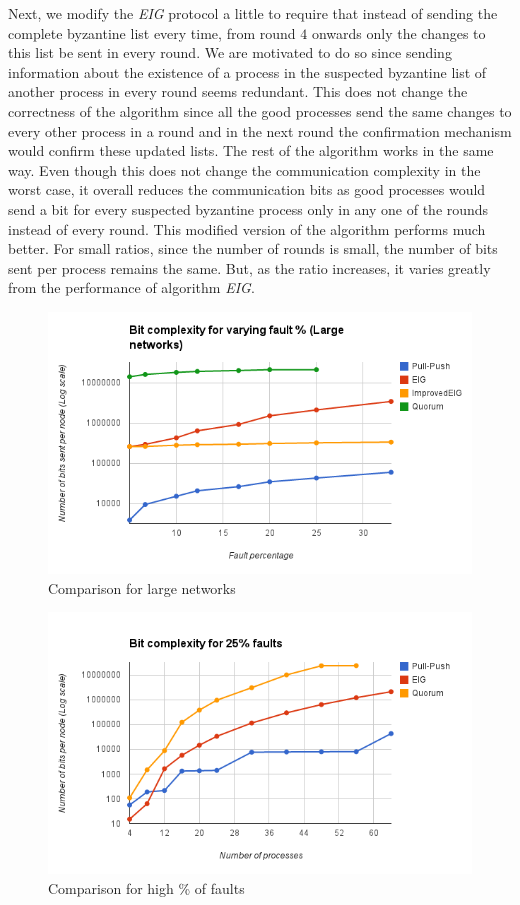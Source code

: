         Next, we modify the \textit{EIG} protocol a little to require that instead of sending the complete byzantine list every time, from round $4$ onwards only the changes to this list be sent in every round. We are motivated to do so since sending information about the existence of a process in the suspected byzantine list of another process in every round seems redundant. This does not change the correctness of the algorithm since all the good processes send the same changes to every other process in a round and in the next round the confirmation mechanism would confirm these updated lists. The rest of the algorithm works in the same way. Even though this does not change the communication complexity in the worst case, it overall reduces the communication bits as good processes would send a bit for every suspected byzantine process only in any one of the rounds instead of every round. This modified version of the algorithm performs much better. For small ratios, since the number of rounds is small, the number of bits sent per process remains the same. But, as the ratio increases, it varies greatly from the performance of algorithm \textit{EIG}.
\begin{figure}[ht]
 \centering
\includegraphics[scale=0.4]{LargeNetBit}
\caption{Comparison for large networks}
 \label{fig:comp}
\vspace{-2mm}
\end{figure}

\begin{figure}[ht]
 \centering
\includegraphics[scale=0.4]{Fault25}
\caption{Comparison for high \% of faults}
 \label{fig:fault25}
\vspace{-2mm}
\end{figure}

